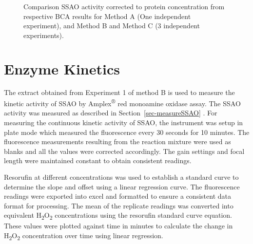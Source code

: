 \documentclass[
  letterpaper,
  DIV=11,
  numbers=noendperiod]{scrreprt}
\begin{document}
\begin{figure}[H]


\caption{\label{fig-ssaoactivity}Comparison SSAO activity corrected to
protein concentration from respective BCA results for Method A (One
independent experiment), and Method B and Method C (3 independent
experiments).}

\end{figure}%

\section{Enzyme Kinetics}\label{enzyme-kinetics}

The extract obtained from Experiment 1 of method B is used to measure
the kinetic activity of SSAO by Amplex\textsuperscript{®} red monoamine
oxidase assay. The SSAO activity was measured as described in
Section~\ref{sec-measureSSAO} . For measuring the continuous kinetic
activity of SSAO, the instrument was setup in plate mode which measured
the fluorescence every 30 seconds for 10 minutes. The fluorescence
measurements resulting from the reaction mixture were used as blanks and
all the values were corrected accordingly. The gain settings and focal
length were maintained constant to obtain consistent readings.

Resorufin at different concentrations was used to establish a standard
curve to determine the slope and offset using a linear regression curve.
The fluorescence readings were exported into excel and formatted to
ensure a consistent data format for processing. The mean of the
replicate readings was converted into equivalent
H\textsubscript{2}O\textsubscript{2} concentrations using the resorufin
standard curve equation. These values were plotted against time in
minutes to calculate the change in H\textsubscript{2}O\textsubscript{2}
concentration over time using linear regression.
\end{document}

